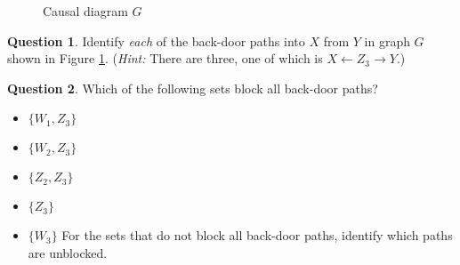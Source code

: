 \documentclass[11pt]{amsart}
\theoremstyle{definition}
\theoremstyle{question}
\newtheorem{question}{Question}
\begin{document}
\begin{figure}[h]
	\caption{Causal diagram $G$} \label{fig:causal}
    \centering
    

\end{figure}

\begin{question}
Identify \emph{each} of the back-door paths into $X$ from $Y$ in graph $G$ shown in Figure \ref{fig:causal}. (\emph{Hint:} There are three, one of which is $X \leftarrow Z_3 \rightarrow Y$.)
\end{question}

\begin{question}
Which of the following sets block all back-door paths?
	\begin{itemize}
		\item $\{ W_1, Z_3 \}$
		\item $\{ W_2, Z_3 \}$
		\item $\{ Z_2, Z_3 \}$
		\item $\{ Z_3 \}$
		\item $\{ W_3 \}$
For the sets that do not block all back-door paths, identify which paths are unblocked.
	\end{itemize}
\end{question}


\end{document}
